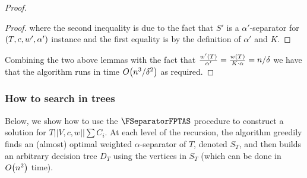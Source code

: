 \begin{theorem}
\begin{proof}
\begin{lemma}
\begin{proof}
                where the second inequality is due to the fact that $S'$ is a $\alpha'$-separator for $\mathopen{}\left( T, c, w', \alpha' \right)$ instance and the first equality is by the definition of $\alpha'$ and $K$.
            \end{proof}
        \end{lemma}
            
        Combining the two above lemmas with the fact that $\frac{w'\mathopen{}\left( T \right)}{\alpha'}=\frac{w\mathopen{}\left( T \right)}{K\cdot \alpha}=n/\delta$ we have that the algorithm runs in time $O\mathopen{}\left( n^3/\delta^2 \right)$ as required.
\end{proof}
\end{theorem}
\subsubsection{How to search in trees}\label{HowToSearchInTs}
Below, we show how to use the $\FSeparatorFPTAS$ procedure to construct a solution 
for $T||V,c,w||\sum C_i$. 
At each level of the recursion, the algorithm greedily finds an (almost) optimal 
weighted $\alpha$-separator of $T$, denoted $S_T$, and then builds an arbitrary 
decision tree $D_T$ using the vertices in $S_T$ (which can be done in $O\mathopen{}\left( n^2 \right)$ time). 

